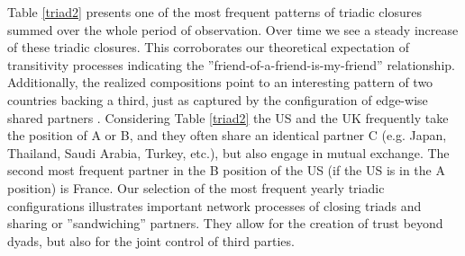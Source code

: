 \documentclass[12pt, letterpaper]{article}
\numberwithin{equation}{section}
\begin{document}
Table \ref{triad2} presents one of the most frequent patterns of triadic closures summed over the whole period of observation. Over time we see a steady increase of these triadic closures. This corroborates our theoretical expectation of transitivity processes indicating the ''friend-of-a-friend-is-my-friend'' relationship. Additionally, the realized compositions point to an interesting pattern of two countries backing a third, just as captured by the configuration of edge-wise shared partners \citep{HunHan:06, SnijPattRobHand:06}.  Considering Table \ref{triad2} the US and the UK frequently take the position of A or B, and they often share an identical partner C (e.g. Japan, Thailand, Saudi Arabia, Turkey, etc.), but also engage in mutual exchange. The second most frequent partner in the B position of the US (if the US is in the A position) is France. Our selection of the most frequent yearly triadic configurations illustrates important network processes of closing triads and sharing or ''sandwiching'' partners. They allow for the creation of trust beyond dyads, but also for the joint control of third parties.



\end{document}
